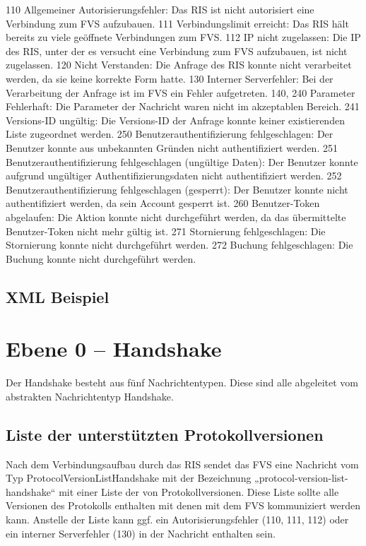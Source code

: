 110	Allgemeiner Autorisierungsfehler: Das RIS ist nicht autorisiert eine Verbindung zum FVS aufzubauen.
111	Verbindungslimit erreicht: Das RIS hält bereits zu viele geöffnete Verbindungen zum FVS.
112	IP nicht zugelassen: Die IP des RIS, unter der es versucht eine Verbindung zum FVS aufzubauen, ist nicht zugelassen.
120	Nicht Verstanden: Die Anfrage des RIS konnte nicht verarbeitet werden, da sie keine korrekte Form hatte.
130	Interner Serverfehler: Bei der Verarbeitung der Anfrage ist im FVS ein Fehler aufgetreten.
140, 240	Parameter Fehlerhaft: Die Parameter der Nachricht waren nicht im akzeptablen Bereich.
241	Versions-ID ungültig: Die Versions-ID der Anfrage konnte keiner existierenden Liste zugeordnet werden.
250	Benutzerauthentifizierung fehlgeschlagen: Der Benutzer konnte aus unbekannten Gründen nicht authentifiziert werden.
251	Benutzerauthentifizierung fehlgeschlagen (ungültige Daten): Der Benutzer konnte aufgrund ungültiger Authentifizierungsdaten nicht authentifiziert werden.
252	Benutzerauthentifizierung fehlgeschlagen (gesperrt): Der Benutzer konnte nicht authentifiziert werden, da sein Account gesperrt ist.
260	Benutzer-Token abgelaufen: Die Aktion konnte nicht durchgeführt werden, da das übermittelte Benutzer-Token nicht mehr gültig ist.
271	Stornierung fehlgeschlagen: Die Stornierung konnte nicht durchgeführt werden.
272	Buchung fehlgeschlagen: Die Buchung konnte nicht durchgeführt werden.

\subsection{XML Beispiel}

\section{Ebene 0 -- Handshake}
Der Handshake besteht aus fünf Nachrichtentypen. Diese sind alle abgeleitet vom abstrakten Nachrichtentyp Handshake.

\subsection{Liste der unterstützten Protokollversionen}
Nach dem Verbindungsaufbau durch das RIS sendet das FVS eine Nachricht vom Typ ProtocolVersionListHandshake mit der Bezeichnung „protocol-version-list-handshake“ mit einer Liste der von Protokollversionen. Diese Liste sollte alle Versionen des Protokolls enthalten mit denen mit dem FVS kommuniziert werden kann. Anstelle der Liste kann ggf. ein Autorisierungsfehler (110, 111, 112) oder ein interner Serverfehler (130) in der Nachricht enthalten sein.

